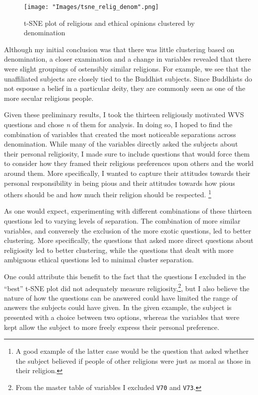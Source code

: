 \documentclass{article}
\begin{document}
	\begin{figure}[h]
		\centering
		\texttt{[image: "Images/tsne\_relig\_denom".png]}
		\caption{t-SNE plot of religious and ethical opinions clustered by denomination}
	\end{figure}

 	Although my initial conclusion was that there was little clustering based on denomination, a closer examination and a change in variables revealed that there were slight groupings of ostensibly similar religions. For example, we see that the unaffiliated subjects are closely tied to the Buddhist subjects. Since Buddhists do not espouse a belief in a particular deity, they are commonly seen as one of the more secular religious people.

	Given these preliminary results, I took the thirteen religiously motivated WVS questions and chose \textit{n} of them for analysis. In doing so, I hoped to find the combination of variables that created the most noticeable separations across denomination. While many of the variables directly asked the subjects about their personal religiosity, I made sure to include questions that would force them to consider how they framed their religious preferences upon others and the world around them. More specifically, I wanted to capture their attitudes towards their personal responsibility in being pious and their attitudes towards how pious others should be and how much their religion should be respected. \footnote{A good example of the latter case would be the question that asked whether the subject believed if people of other religions were just as moral as those in their religion.}
	
	As one would expect, experimenting with different combinations of these thirteen questions led to varying levels of separation. The combination of more similar variables, and conversely the exclusion of the more exotic questions, led to better clustering. More specifically, the questions that asked more direct questions about religiosity led to better clustering, while the questions that dealt with more ambiguous ethical questions led to minimal cluster separation.
	
	One could attribute this benefit to the fact that the questions I excluded in the ``best'' t-SNE plot did not adequately measure religiosity,\footnote{From the master table of variables I excluded \texttt{V70} and \texttt{V73}.}, but I also believe the nature of how the questions can be answered could have limited the range of answers the subjects could have given. In the given example, the subject is presented with a choice between two options, whereas the variables that were kept allow the subject to more freely express their personal preference.
\end{document}
